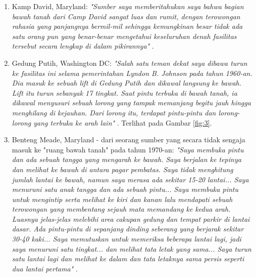 \documentclass[10pt,twocolumn,letterpaper]{article}
\begin{document}
\begin{flushleft}
\begin{enumerate}
    \item Kamp David, Maryland: \textit{"Sumber saya memberitahukan saya bahwa bagian bawah tanah dari Camp David sangat luas dan rumit, dengan terowongan rahasia yang panjangnya bermil-mil sehingga kemungkinan besar tidak ada satu orang pun yang benar-benar mengetahui keseluruhan denah fasilitas tersebut secara lengkap di dalam pikirannya"} \cite{22}.
    \item Gedung Putih, Washington DC: \textit{"Salah satu teman dekat saya dibawa turun ke fasilitas ini selama pemerintahan Lyndon B. Johnson pada tahun 1960-an. Dia masuk ke sebuah lift di Gedung Putih dan dikawal langsung ke bawah. Lift itu turun sebanyak 17 tingkat. Saat pintu terbuka di bawah tanah, ia dikawal menyusuri sebuah lorong yang tampak memanjang begitu jauh hingga menghilang di kejauhan. Dari lorong itu, terdapat pintu-pintu dan lorong-lorong yang terbuka ke arah lain"} \cite{22}. Terlihat pada Gambar \ref{fig:3}.
    \item Benteng Meade, Maryland - dari seorang sumber yang secara tidak sengaja masuk ke "ruang bawah tanah" pada tahun 1970-an: \textit{"Saya membuka pintu dan ada sebuah tangga yang mengarah ke bawah. Saya berjalan ke tepinya dan melihat ke bawah di antara pagar pembatas. Saya tidak menghitung jumlah lantai ke bawah, namun saya merasa ada sekitar 15-20 lantai... Saya menuruni satu anak tangga dan ada sebuah pintu... Saya membuka pintu untuk mengintip serta melihat ke kiri dan kanan lalu mendapati sebuah terowongan yang membentang sejauh mata memandang ke kedua arah. Luasnya jelas-jelas melebihi area cakupan gedung dan tempat parkir di lantai dasar. Ada pintu-pintu di sepanjang dinding seberang yang berjarak sekitar 30-40 kaki... Saya memutuskan untuk memeriksa beberapa lantai lagi, jadi saya menuruni satu tingkat... dan melihat tata letak yang sama... Saya turun satu lantai lagi dan melihat ke dalam dan tata letaknya sama persis seperti dua lantai pertama"} \cite{22}.
\end{enumerate}
\end{flushleft}
\end{document}
